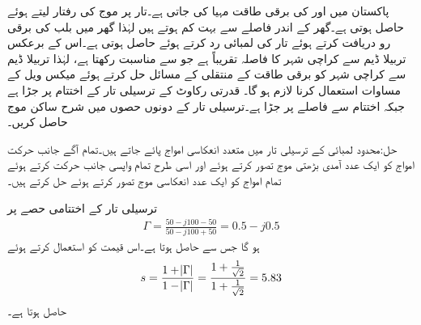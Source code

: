 پاکستان میں  اور  کی برقی طاقت مہیا کی جاتی ہے۔تار پر موج کی رفتار  لیتے ہوئے  حاصل ہوتی ہے۔گھر کے اندر فاصلے  سے بہت کم ہوتے ہیں لہٰذا گھر میں  بلب کی برقی رو دریافت کرتے ہوئے  تار کی لمبائی رد کرتے ہوئے   حاصل ہوتی ہے۔اس کے برعکس تربیلا ڈیم سے کراچی شہر کا فاصلہ تقریباً  ہے جو  سے مناسبت رکھتا ہے، لہٰذا تربیلا ڈیم سے کراچی شہر کو برقی طاقت کے منتقلی کے مسائل حل کرتے ہوئے میکس ویل کے مساوات استعمال کرنا لازم ہو گا۔ 
قدرتی رکاوٹ  کے ترسیلی تار کے اختتام پر  جڑا ہے جبکہ اختتام سے  فاصلے پر   جڑا ہے۔ترسیلی تار کے دونوں حصوں میں شرح ساکن موج  حاصل کریں۔

حل:محدود لمبائی کے ترسیلی تار میں متعدد انعکاسی امواج پائے جاتے ہیں۔تمام آگے جانب حرکت امواج کو ایک عدد آمدی بڑھتی موج تصور کرتے ہوئے اور اسی طرح تمام واپسی جانب حرکت کرتے ہوئے تمام امواج کو ایک عدد انعکاسی موج تصور کرتے ہوئے حل کرتے ہیں۔

ترسیلی تار کے اختتامی حصے پر
\begin{align*}
\Gamma=\frac{50-j100-50}{50-j100+50}=0.5-j0.5 
\end{align*}
ہو گا جس سے   حاصل ہوتا ہے۔اس قیمت کو استعمال کرتے ہوئے
\begin{align*}
s=\frac{1+\abs{\Gamma}}{1-\abs{\Gamma}}=\frac{1+\frac{1}{\sqrt{2}}}{1+\frac{1}{\sqrt{2}}}=5.83
\end{align*}
حاصل ہوتا ہے۔

